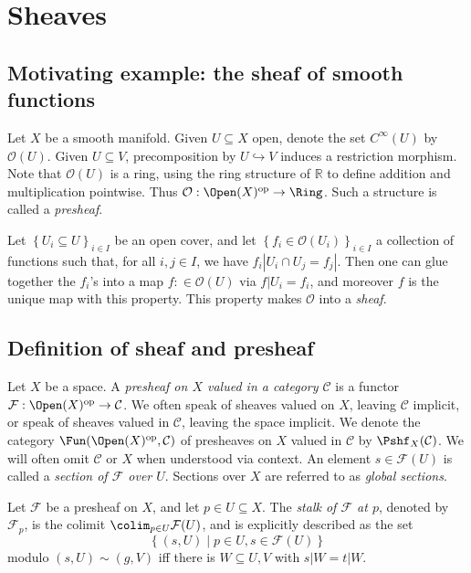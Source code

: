 \chapter{Sheaves}

\section{Motivating example: the sheaf of smooth functions}

Let $X$ be a smooth manifold. Given $U\subseteq X$ open, denote the set $C^\infty (U)$ by $\mathcal{O} (U)$. Given $U\subseteq V$, precomposition by $U\hookrightarrow V$ induces a restriction morphism. Note that $\mathcal{O} (U)$ is a ring, using the ring structure of $\mathbb{R} $ to define addition and multiplication pointwise. Thus $\mathcal{O} : \Open(X) ^{\mathrm{op}}  \to \Ring $. Such a structure is called a \emph{presheaf}.

Let $\left\{ U_i \subseteq U \right\}_{i\in I} $ be an open cover, and let $\left\{ f_i\in \mathcal{O} (U_i) \right\}_{i\in I}  $ a collection of functions such that, for all $i,j\in I$, we have $f_i|U_i \cap U_j = f_j|$. Then one can glue together the $f_i$'s into a map $f : \in \mathcal{O} (U) $ via $f|U_i = f_i$, and moreover $f$ is the unique map with this property. This property makes $\mathcal{O} $ into a \emph{sheaf}.

\section{Definition of sheaf and presheaf}

\begin{definition}\label{dfn:2-2-1}
	Let $X$ be a space. A \emph{presheaf on $X$ valued in a category $\mathcal{C} $} is a functor $\mathcal{F} : \Open(X) ^{\mathrm{op}}  \to \mathcal{C} $. We often speak of sheaves valued on $X$, leaving $\mathcal{C} $ implicit, or speak of sheaves valued in $\mathcal{C} $, leaving the space implicit. We denote the category $\Fun(\Open(X) ^{\mathrm{op}} , \mathcal{C} ) $ of presheaves on $X$ valued in $\mathcal{C} $ by $\Pshf_X(\mathcal{C} )$. We will often omit $\mathcal{C} $ or $X$ when understood via context. An element $s\in \mathcal{F} (U)$ is called a \emph{section of $\mathcal{F} $ over $U$}. Sections over $X$ are referred to as \emph{global sections}.
\end{definition}

\begin{definition}\label{dfn:2-2-2}
	Let $\mathcal{F} $ be a presheaf on $X$, and let $p\in U\subseteq X$. The \emph{stalk of $\mathcal{F} $ at $p$}, denoted by $\mathcal{F} _p$, is the colimit $\colim_{p\in U} \mathcal{F}(U) $, and is explicitly described as the set
	\[
		\left\{ (s,U)\mid p\in U,s\in \mathcal{F} (U) \right\} 
	\]
	modulo $(s,U)\sim (g,V)$ iff there is $W\subseteq U,V$ with $s|W=t|W$.
\end{definition}

